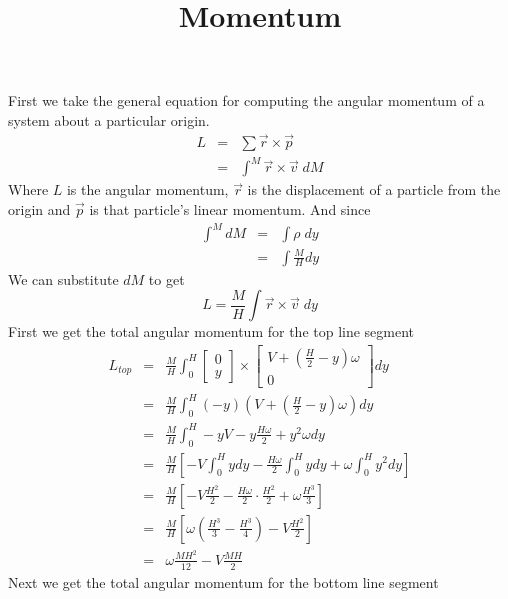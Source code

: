 \documentclass[12pt]{article}
\title{Momentum}
\date{}
\begin{document}
First we take the general equation for computing the angular momentum of a system about a
particular origin.
\begin{eqnarray*}
L
   &=& \sum \vec{r} \times \vec{p} \nonumber \\
   &=& \int^{M} \vec{r} \times \vec{v} \; dM
\end{eqnarray*}
Where $L$ is the angular momentum, $\vec{r}$ is the displacement of a particle from the origin
and $\vec{p}$ is that particle's linear momentum.  And since
\begin{eqnarray*}
\int^{M} dM
   &=& \int \rho \; dy \nonumber \\
   &=& \int \frac{M}{H} dy
\end{eqnarray*}
We can substitute $dM$ to get
\begin{equation*}
L = \frac{M}{H} \int \vec{r} \times \vec{v} \; dy
\end{equation*}
First we get the total angular momentum for the top line segment
\begin{eqnarray*}
L_{top}
   &=& \frac{M}{H} \int_{0}^{H}
       \begin{bmatrix}
           0 \\
           y
       \end{bmatrix} \times
       \begin{bmatrix}
           V + \left( \frac{H}{2} - y \right) \omega \\
           0
       \end{bmatrix} dy \\
   &=& \frac{M}{H} \int_{0}^{H}
       \left( -y \right)
       \left( V + \left( \frac{H}{2} - y \right) \omega \right) dy \\
   &=& \frac{M}{H} \int_{0}^{H} -y V - y\frac{H \omega}{2} + y^2 \omega dy \\
   &=& \frac{M}{H}
       \left[
           - V \int_{0}^{H} y dy
           - \frac{H \omega}{2} \int_{0}^{H} y dy
           + \omega \int_{0}^{H} y^2 dy
       \right] \\
   &=& \frac{M}{H}
       \left[
           - V \frac{H^2}{2} - \frac{H \omega}{2} \cdot \frac{H^2}{2} + \omega \frac{H^3}{3}
       \right] \\
   &=& \frac{M}{H}
       \left[
           \omega \left( \frac{H^3}{3} - \frac{H^3}{4} \right) - V \frac{H^2}{2}
       \right] \\
   &=& \omega \frac{M H^2}{12} - V \frac{M H}{2}
\end{eqnarray*}
Next we get the total angular momentum for the bottom line segment
\end{document}
